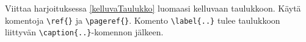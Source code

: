     \begin{harj}
        Viittaa harjoituksessa \ref{kelluvaTaulukko} luomaasi kelluvaan taulukkoon. Käytä komentoja \lstinline-\ref{}- ja \lstinline-\pageref{}-. Komento \lstinline-\label{..}- tulee taulukkoon liittyvän \lstinline-\caption{..}--komennon jälkeen.
    \end{harj}
